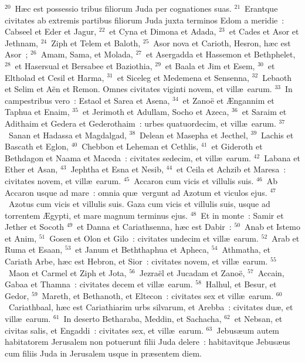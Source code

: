 ${}^{20}$~H\ae c est possessio tribus filiorum Juda per cognationes suas.
${}^{21}$~Erantque civitates ab extremis partibus filiorum Juda juxta terminos Edom a meridie~: Cabseel et Eder et Jagur,
${}^{22}$~et Cyna et Dimona et Adada,
${}^{23}$~et Cades et Asor et Jethnam,
${}^{24}$~Ziph et Telem et Baloth,
${}^{25}$~Asor nova et Carioth, Hesron, h\ae c est Asor~;
${}^{26}$~Amam, Sama, et Molada,
${}^{27}$~et Asergadda et Hassemon et Bethphelet,
${}^{28}$~et Hasersual et Bersabee et Baziothia,
${}^{29}$~et Baala et Jim et Esem,
${}^{30}$~et Eltholad et Cesil et Harma,
${}^{31}$~et Siceleg et Medemena et Sensenna,
${}^{32}$~Lebaoth et Selim et A\"en et Remon. Omnes civitates viginti novem, et vill\ae\ earum.
${}^{33}$~In campestribus vero~: Estaol et Sarea et Asena,
${}^{34}$~et Zano\"e et \AE ngannim et Taphua et Enaim,
${}^{35}$~et Jerimoth et Adullam, Socho et Azeca,
${}^{36}$~et Saraim et Adithaim et Gedera et Gederothaim~: urbes quatuordecim, et vill\ae\ earum.
${}^{37}$~Sanan et Hadassa et Magdalgad,
${}^{38}$~Delean et Masepha et Jecthel,
${}^{39}$~Lachis et Bascath et Eglon,
${}^{40}$~Chebbon et Leheman et Cethlis,
${}^{41}$~et Gideroth et Bethdagon et Naama et Maceda~: civitates sedecim, et vill\ae\ earum.
${}^{42}$~Labana et Ether et Asan,
${}^{43}$~Jephtha et Esna et Nesib,
${}^{44}$~et Ceila et Achzib et Maresa~: civitates novem, et vill\ae\ earum.
${}^{45}$~Accaron cum vicis et villulis suis.
${}^{46}$~Ab Accaron usque ad mare~: omnia qu\ae\ vergunt ad Azotum et viculos ejus.
${}^{47}$~Azotus cum vicis et villulis suis. Gaza cum vicis et villulis suis, usque ad torrentem \AE gypti, et mare magnum terminus ejus.
${}^{48}$~Et in monte~: Samir et Jether et Socoth
${}^{49}$~et Danna et Cariathsenna, h\ae c est Dabir~:
${}^{50}$~Anab et Istemo et Anim,
${}^{51}$~Gosen et Olon et Gilo~: civitates undecim et vill\ae\ earum.
${}^{52}$~Arab et Ruma et Esaan,
${}^{53}$~et Janum et Beththaphua et Apheca,
${}^{54}$~Athmatha, et Cariath Arbe, h\ae c est Hebron, et Sior~: civitates novem, et vill\ae\ earum.
${}^{55}$~Maon et Carmel et Ziph et Jota,
${}^{56}$~Jezra\"el et Jucadam et Zano\"e,
${}^{57}$~Accain, Gabaa et Thamna~: civitates decem et vill\ae\ earum.
${}^{58}$~Halhul, et Besur, et Gedor,
${}^{59}$~Mareth, et Bethanoth, et Eltecon~: civitates sex et vill\ae\ earum.
${}^{60}$~Cariathbaal, h\ae c est Cariathiarim urbs silvarum, et Arebba~: civitates du\ae , et vill\ae\ earum.
${}^{61}$~In deserto Betharaba, Meddin, et Sachacha,
${}^{62}$~et Nebsan, et civitas salis, et Engaddi~: civitates sex, et vill\ae\ earum.
${}^{63}$~Jebus\ae um autem habitatorem Jerusalem non potuerunt filii Juda delere~: habitavitque Jebus\ae us cum filiis Juda in Jerusalem usque in pr\ae sentem diem.

